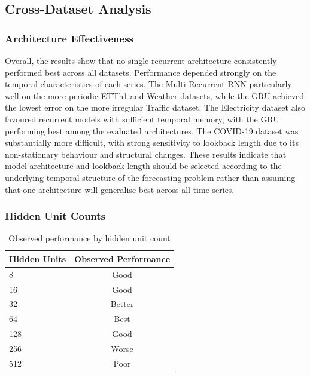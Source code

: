\documentclass[conference]{IEEEtran}
\begin{document}
\subsection{Cross-Dataset Analysis}

\subsubsection{Architecture Effectiveness}

Overall, the results show that no single recurrent architecture consistently
performed best across all datasets. Performance depended strongly on the
temporal characteristics of each series. The Multi-Recurrent RNN 
particularly well on the more periodic ETTh1 and Weather datasets,
while the GRU achieved the lowest error on the more irregular Traffic dataset.
The Electricity dataset also favoured recurrent models with sufficient temporal
memory, with the GRU performing best among the evaluated architectures.
The COVID-19 dataset was substantially more difficult, with strong sensitivity
to lookback length due to its non-stationary behaviour and structural changes.
These results indicate that model architecture and lookback length should be selected
according to the underlying temporal structure of the forecasting problem rather
than assuming that one architecture will generalise best across all time series.

\subsubsection{Hidden Unit Counts}

\begin{table}[H]
\centering
\caption{Observed performance by hidden unit count}
\label{tab:hidden_units_trend}
\begin{tabular}{lc}
\toprule
\textbf{Hidden Units} & \textbf{Observed Performance} \\
\midrule
8 & Good \\
16 & Good \\
32 & Better \\
64 & Best \\
128 & Good \\
256 & Worse \\
512 & Poor \\
\bottomrule
\end{tabular}
\end{table}
\end{document}
